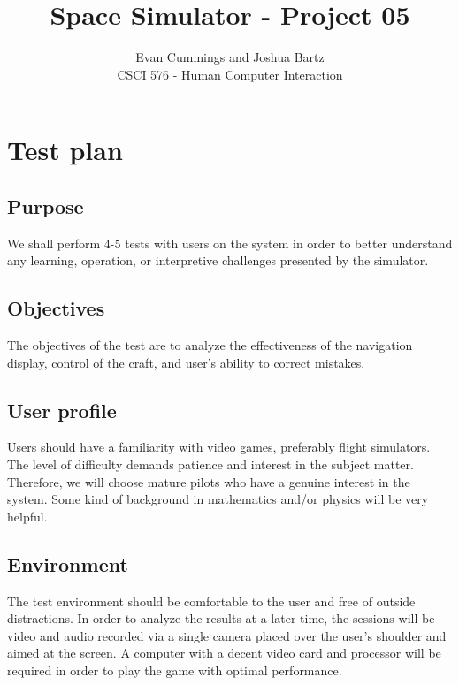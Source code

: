 
\usepackage{tabularx}
\DeclareMathOperator*{\argmax}{arg\,max}


\small

\title{Space Simulator - Project 05}
\author{Evan Cummings and Joshua Bartz\\
CSCI 576 - Human Computer Interaction}

\maketitle

\section{Test plan}

\subsection{Purpose}

We shall perform 4-5 tests with users on the system in order to better understand any learning, operation, or interpretive challenges presented by the simulator.

\subsection{Objectives}

The objectives of the test are to analyze the effectiveness of the navigation display, control of the craft, and user's ability to correct mistakes.

\subsection{User profile}

Users should have a familiarity with video games, preferably flight simulators.  The level of difficulty demands patience and interest in the subject matter.  Therefore, we will choose mature pilots who have a genuine interest in the system. Some kind of background in mathematics and/or physics will be very helpful.

\subsection{Environment}

The test environment should be comfortable to the user and free of outside distractions.  In order to analyze the results at a later time, the sessions will be video and audio recorded via a single camera placed over the user's shoulder and aimed at the screen.  A computer with a decent video card and processor will be required in order to play the game with optimal performance.


